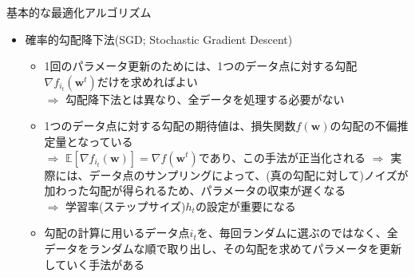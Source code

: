 \documentclass[dvipdfmx,notheorems,t]{beamer}
\begin{document}
\begin{frame}{基本的な最適化アルゴリズム}

\begin{itemize}
	\item 確率的勾配降下法(SGD; Stochastic Gradient Descent)
	\begin{itemize}
		\item 1回のパラメータ更新のためには、1つのデータ点に対する勾配$\nabla f_{i_t}(\bm{w}^t)$だけを求めればよい \\
		$\Rightarrow$ 勾配降下法とは異なり、全データを処理する必要がない
		\newline
		
		\item 1つのデータ点に対する勾配の期待値は、損失関数$f(\bm{w})$の勾配の不偏推定量となっている \\
		$\Rightarrow$ $\mathbb{E} \left[ \nabla f_{i_t}(\bm{w}) \right] = \nabla f(\bm{w}^t)$であり、この手法が正当化される \newline \newline
		$\Rightarrow$ 実際には、データ点のサンプリングによって、(真の勾配に対して)ノイズが加わった勾配が得られるため、パラメータの収束が遅くなる \\
		$\Rightarrow$ 学習率(ステップサイズ)$h_t$の設定が重要になる
		\newline
		
		\item 勾配の計算に用いるデータ点$i_t$を、毎回ランダムに選ぶのではなく、全データをランダムな順で取り出し、その勾配を求めてパラメータを更新していく手法がある
	\end{itemize}
\end{itemize}

\end{frame}
\end{document}
